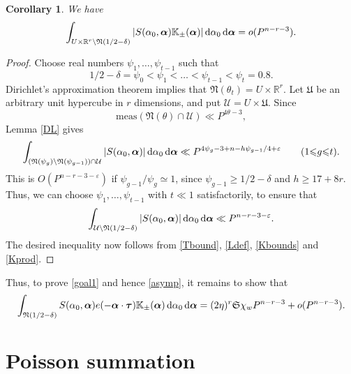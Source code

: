 \documentclass[12pt,reqno]{amsart}
\newtheorem{cor}[thm]{Corollary}
\theoremstyle{definition}
\theoremstyle{remark}
\numberwithin{equation}{section}
\begin{document}
\begin{cor} \label{FirstArcs} We have
\[
\int_{U \times {\mathbb R}^r \setminus {\mathfrak N}(1/2 - {{\delta}})} |S({{\alpha}}_0, {\boldsymbol{{\alpha}}}) {\mathbb K}_\pm ({\boldsymbol{{\alpha}}})| {{\,{\rm d}}} {{\alpha}}_0 {{\,{\rm d}}} {\boldsymbol{{\alpha}}} = o(P^{n-r-3}). 
\]
\end{cor}

\begin{proof}
Choose real numbers $\psi_1, \ldots, \psi_{t-1}$ such that
\[
1/2 - {{\delta}} = \psi_0 < \psi_1 < \ldots < \psi_{t-1} < \psi_t = 0.8.
\]
Dirichlet's approximation theorem \cite[Lemma 2.1]{Vau1997} implies that \mbox{${\mathfrak N}({{\theta}}_t) = U \times {\mathbb R}^r$.} Let ${\mathfrak U}$ be an arbitrary unit hypercube in $r$ dimensions, and put ${\mathcal U} = U \times {\mathfrak U}$. Since
\[
{\mathrm{meas}}({\mathfrak N}({{\theta}}) \cap {\mathcal U}) \ll P^{4 {{\theta}}-3},
\]
Lemma \ref{DL} gives
\[
\int_{({\mathfrak N}(\psi_g) \setminus {\mathfrak N}(\psi_{g-1})) \cap {\mathcal U}} |S({{\alpha}}_0,{\boldsymbol{{\alpha}}})| {{\,{\rm d}}} {{\alpha}}_0 {{\,{\rm d}}} {\boldsymbol{{\alpha}}} 
\ll   P^{4 \psi_g - 3 + n - h \psi_{g-1}/4 + {\varepsilon}} \qquad (1 {\leqslant} g {\leqslant} t).
\]
This is $O(P^{n-r-3-{\varepsilon}})$ if $\psi_{g-1} / \psi_g \simeq 1$, since $\psi_{g-1} {\geqslant} 1/2 - {{\delta}}$ and $h {\geqslant} 17 + 8r$. Thus, we can choose $\psi_1, \ldots, \psi_{t-1}$ with $t \ll 1$ satisfactorily, to ensure that
\[
\int_{{\mathcal U} \setminus {\mathfrak N}(1/2 - {{\delta}})} |S({{\alpha}}_0,{\boldsymbol{{\alpha}}})| {{\,{\rm d}}} {{\alpha}}_0 {{\,{\rm d}}} {\boldsymbol{{\alpha}}} \ll P^{n-r-3-{\varepsilon}}.
\]
The desired inequality now follows from \eqref{Tbound}, \eqref{Ldef}, \eqref{Kbounds} and \eqref{Kprod}. 
\end{proof}

Thus, to prove \eqref{goal1} and hence \eqref{asymp}, it remains to show that
\begin{equation} \label{goal2}
\int_{{\mathfrak N}(1/2-{{\delta}})} S({{\alpha}}_0,{\boldsymbol{{\alpha}}}) e(-{\boldsymbol{{\alpha}}} \cdot {\boldsymbol{\tau}}) {\mathbb K}_\pm({\boldsymbol{{\alpha}}}) {{\,{\rm d}}} {{\alpha}}_0 {{\,{\rm d}}} {\boldsymbol{{\alpha}}} =  (2 \eta)^r {\mathfrak S} \chi_w P^{n-r-3} + o(P^{n-r-3}).
\end{equation}

\section{Poisson summation}
\label{Poisson}
\end{document}
